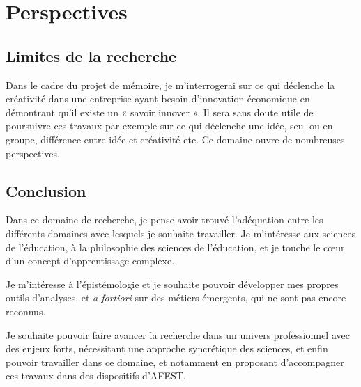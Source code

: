 \documentclass{article}
\begin{document}
\section{Perspectives}

\subsection{Limites de la recherche}

Dans le cadre du projet de mémoire, je m'interrogerai sur ce qui déclenche la créativité dans une entreprise ayant besoin d'innovation économique en démontrant qu'il existe un « savoir innover ». Il sera sans doute utile de poursuivre ces travaux par exemple sur ce qui déclenche une idée, seul ou en groupe, différence entre idée et créativité etc. Ce domaine ouvre de nombreuses perspectives.  

\subsection{Conclusion}

Dans ce domaine de recherche, je pense avoir trouvé l'adéquation entre les différents domaines avec lesquels je souhaite travailler. Je m'intéresse aux sciences de l'éducation, à la philosophie des sciences de l'éducation, et je touche le cœur d'un concept d'apprentissage complexe.

Je m'intéresse à l'épistémologie et je souhaite pouvoir développer mes propres outils d'analyses, et \emph{a fortiori} sur des métiers émergents, qui ne sont pas encore reconnus.

Je souhaite pouvoir faire avancer la recherche dans un univers professionnel avec des enjeux forts, nécessitant une approche syncrétique des sciences, et enfin pouvoir travailler dans ce domaine, et notamment en proposant d'accompagner ces travaux dans des dispositifs d'AFEST.
\end{document}
